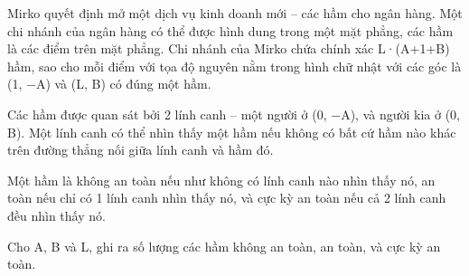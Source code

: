 Mirko quyết định mở một dịch vụ kinh doanh mới – các hầm cho ngân hàng. Một chi nhánh của ngân hàng có thể được hình dung trong một mặt phẳng, các hầm là các điểm trên mặt phẳng. Chi nhánh của Mirko chứa chính xác L·(A+1+B) hầm, sao cho mỗi điểm với tọa độ nguyên nằm trong hình chữ nhật với các góc là (1, −A) và (L, B) có đúng một hầm.  

   Các hầm được quan sát bởi 2 lính canh – một người ở (0, −A),  và người kia ở (0, B). Một lính canh có thể nhìn thấy một hầm nếu không có bất cứ hầm nào khác trên đường thẳng nối giữa lính canh và hầm đó.  

   Một hầm là không an toàn nếu như không có lính canh nào nhìn thấy nó, an toàn nếu chỉ có 1 lính canh nhìn thấy nó, và cực kỳ an toàn nếu cả 2 lính canh đều nhìn thấy nó.  

   Cho A, B và L, ghi ra số lượng các hầm không an toàn, an toàn, và cực kỳ an toàn.